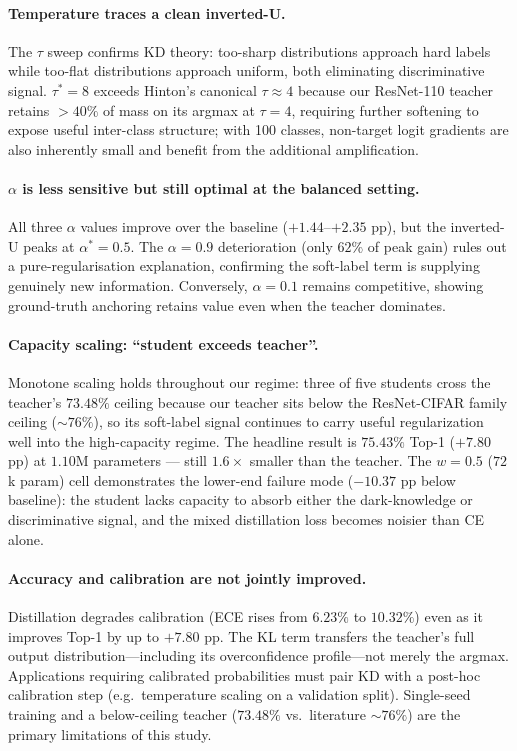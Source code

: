\documentclass{article}
\theoremstyle{plain}
\theoremstyle{definition}
\theoremstyle{remark}
\begin{document}
\paragraph{Temperature traces a clean inverted-U.}
The $\tau$ sweep confirms KD theory: too-sharp distributions approach hard labels while too-flat distributions approach uniform, both eliminating discriminative signal. $\tau^* = 8$ exceeds Hinton's canonical $\tau \approx 4$ because our ResNet-110 teacher retains $>40\%$ of mass on its argmax at $\tau=4$, requiring further softening to expose useful inter-class structure; with 100 classes, non-target logit gradients are also inherently small and benefit from the additional amplification.

\paragraph{$\alpha$ is less sensitive but still optimal at the balanced setting.}
All three $\alpha$ values improve over the baseline ($+1.44$--$+2.35$ pp), but the inverted-U peaks at $\alpha^* = 0.5$. The $\alpha=0.9$ deterioration (only $62\%$ of peak gain) rules out a pure-regularisation explanation, confirming the soft-label term is supplying genuinely new information. Conversely, $\alpha=0.1$ remains competitive, showing ground-truth anchoring retains value even when the teacher dominates.

\paragraph{Capacity scaling: ``student exceeds teacher''.}
Monotone scaling holds throughout our regime: three of five students cross the teacher's $73.48\%$ ceiling because our teacher sits below the ResNet-CIFAR family ceiling (${\sim}76\%$), so its soft-label signal continues to carry useful regularization well into the high-capacity regime. The headline result is $\mathbf{75.43\%}$ Top-1 ($+7.80$ pp) at $1.10$M parameters --- still $1.6\times$ smaller than the teacher. The $w=0.5$ ($72$k param) cell demonstrates the lower-end failure mode ($-10.37$ pp below baseline): the student lacks capacity to absorb either the dark-knowledge or discriminative signal, and the mixed distillation loss becomes noisier than CE alone.

\paragraph{Accuracy and calibration are not jointly improved.}
Distillation degrades calibration (ECE rises from $6.23\%$ to $10.32\%$) even as it improves Top-1 by up to $+7.80$ pp. The KL term transfers the teacher's full output distribution---including its overconfidence profile---not merely the argmax. Applications requiring calibrated probabilities must pair KD with a post-hoc calibration step (e.g.\ temperature scaling on a validation split). Single-seed training and a below-ceiling teacher ($73.48\%$ vs.\ literature ${\sim}76\%$) are the primary limitations of this study.
\end{document}

